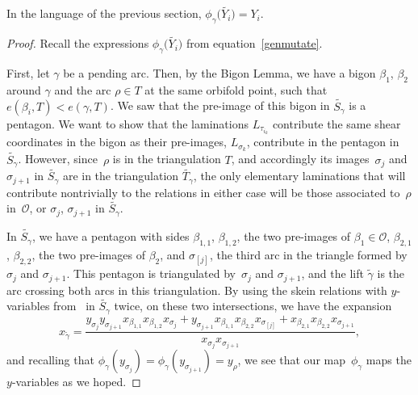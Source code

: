 \begin{Lemma}\label{phimapsys}
In the language of the previous section, $\phi_\gamma\big(\widetilde{Y_i}\big) = Y_i$.
\end{Lemma}

\begin{proof}Recall the expressions $\phi_\gamma\big(\widetilde{Y_i}\big)$ from equation~\eqref{genmutate}.

First, let $\gamma$ be a pending arc. Then, by the Bigon Lemma, we have a bigon $\beta_1$, $\beta_2$ around $\gamma$ and the arc $\rho \in T$ at the same orbifold point, such that $e(\beta_i, T) < e(\gamma,T)$. We saw that the pre-image of this bigon in $\widetilde{S_\gamma}$ is a pentagon. We want to show that the laminations $L_{\tau_{i_k}}$ contribute the same shear coordinates in the bigon as their pre-images, $L_{\sigma_k}$, contribute in the pentagon in~$\widetilde{S_\gamma}$. However, since~$\rho$ is in the triangulation $T$, and accordingly its images~$\sigma_j$ and~$ \sigma_{j+1}$ in $\widetilde{S_\gamma}$ are in the triangulation $\widetilde{T_\gamma}$, the only elementary laminations that will contribute nontrivially to the relations in either case will be those associated to~$\rho$ in~$\mathcal{O}$, or $\sigma_j$, $\sigma_{j+1}$ in $\widetilde{S_\gamma}$.

In $\widetilde{S_\gamma}$, we have a pentagon with sides $\beta_{1,1}$, $\beta_{1,2}$, the two pre-images of $\beta_1 \in \mathcal{O}$, $\beta_{2,1}$, $\beta_{2,2}$, the two pre-images of $\beta_2$, and $\sigma_{[j]}$, the third arc in the triangle formed by~$\sigma_j$ and $\sigma_{j+1}$. This pentagon is triangulated by~$\sigma_j$ and $\sigma_{j+1}$, and the lift $\widetilde{\gamma}$ is the arc crossing both arcs in this triangulation. By using the skein relations with $y$-variables from~\cite{MW} in $\widetilde{S_\gamma}$ twice, on these two intersections, we have the expansion
\[ x_{\widetilde{\gamma}} = \frac{ y_{\sigma_j} y_{\sigma_{j+1}} x_{\beta_{1,1}}x_{\beta_{1,2}}x_{\sigma_j} + y_{\sigma_{j+1}} x_{\beta_{1,1}}x_{\beta_{2,2}}x_{\sigma_{[j]}} + x_{\beta_{2,1}}x_{\beta_{2,2}}x_{\sigma_{j+1}}}{x_{\sigma_j}x_{\sigma_{j+1}}},
\] and recalling that $\phi_\gamma(y_{\sigma_j}) = \phi_\gamma(y_{\sigma_{j+1}}) = y_\rho$, we see that our map~$\phi_\gamma$ maps the $y$-variables as we hoped.


\end{proof}
